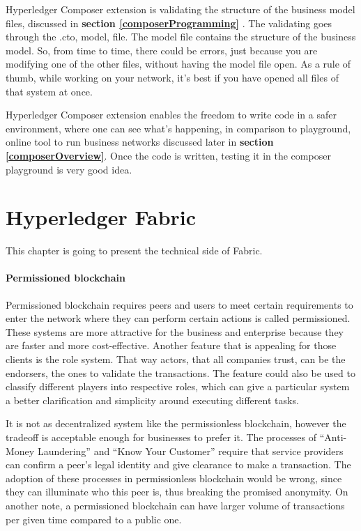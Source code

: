 \documentclass[a4paper,11pt]{report}
\begin{document}
Hyperledger Composer extension is validating the structure of the business model files, discussed in \textbf{section \ref{composerProgramming}} . The validating goes through the .cto, model, file. The model file contains the structure of the business model. So, from time to time, there could be errors, just because you are modifying one of the other files, without having the model file open. As a rule of thumb, while working on your network, it’s best if you have opened all files of that system at once.
  
Hyperledger Composer extension  enables the freedom to write code in a safer environment, where one can see what's happening, in comparison to playground, online tool to run business networks discussed later in \textbf{section \ref{composerOverview}}. Once the code is written, testing it in the composer playground is very good idea. 

\chapter{Hyperledger Fabric}
\label{hplFabric}

This chapter is going to present the technical side of Fabric. 

\subsubsection{Permissioned blockchain}
Permissioned blockchain requires peers and users to meet certain requirements to enter the network where they can perform certain actions is called permissioned. These systems are more attractive for the business and enterprise because they are faster and more cost-effective. Another feature that is appealing for those clients is the role system. That way actors, that all companies trust, can be the endorsers, the ones to validate the transactions. The feature could also be used to classify different players into respective roles, which can give a particular system a better clarification and simplicity around executing different tasks. 

	It is not as decentralized system like the permissionless blockchain, however the tradeoff is acceptable enough for businesses to prefer it. The processes of “Anti-Money Laundering” and “Know Your Customer” require that service providers can confirm a peer’s legal identity and give clearance to make a transaction. The adoption of these processes in permissionless blockchain would be wrong, since they can illuminate who this peer is, thus breaking the promised anonymity. On another note, a permissioned blockchain can have larger volume of transactions per given time compared to a public one. 
	
\end{document}
